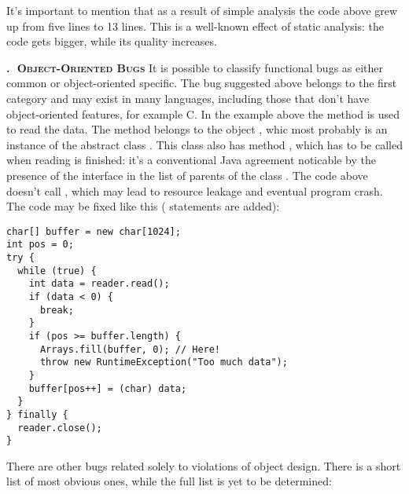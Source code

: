 \documentclass[nosecurity,nobrand]{huawei}
\newcounter{sector}[section]
\renewcommand\thesector{\thesection.\arabic{sector}}
\newcommand{\sector}[1]{\refstepcounter{sector}\vspace{6pt}\textbf{\textsc{\thesector $\;$ #1}}\quad}
\begin{document}
It's important to mention that as a result of simple analysis the code
above grew up from five lines to 13 lines. This is a well-known effect
of static analysis: the code gets bigger, while its quality increases.

\sector{Object-Oriented Bugs}
It is possible to classify functional bugs as either common or object-oriented specific.
The bug suggested above belongs to the first category and may exist in
many languages, including those that don't have object-oriented features,
for example C. In the example above the method  is used to read
the data. The method belongs to the object , whic most probably
is an instance of the abstract class . This class
also has method , which has to be called when reading is finished:
it's a conventional Java agreement noticable by the presence of the
 interface in the list of parents of the class .
The code above doesn't call , which may lead to resource leakage
and eventual program crash. The code may be fixed like this (
statements are added):

\begin{verbatim}
char[] buffer = new char[1024];
int pos = 0;
try {
  while (true) {
    int data = reader.read();
    if (data < 0) {
      break;
    }
    if (pos >= buffer.length) {
      Arrays.fill(buffer, 0); // Here!
      throw new RuntimeException("Too much data");
    }
    buffer[pos++] = (char) data;
  }
} finally {
  reader.close();
}
\end{verbatim}

There are other bugs related solely to violations of object design.
There is a short list of most obvious ones, while the full list is
yet to be determined:
\end{document}
